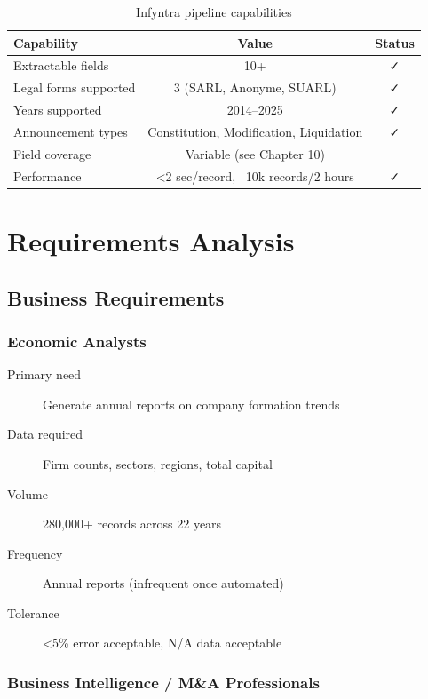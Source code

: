 \documentclass[12pt,a4paper]{report}
\begin{document}
\begin{table}[H]
\centering
\begin{tabular}{|l|c|c|}
\hline
\textbf{Capability} & \textbf{Value} & \textbf{Status} \\
\hline
Extractable fields & 10+ & ✓ \\
Legal forms supported & 3 (SARL, Anonyme, SUARL) & ✓ \\
Years supported & 2014--2025 & ✓ \\
Announcement types & Constitution, Modification, Liquidation & ✓ \\
Field coverage & Variable (see Chapter 10) & 🔄 \\
Performance & <2 sec/record, ~10k records/2 hours & ✓ \\
\hline
\end{tabular}
\caption{Infyntra pipeline capabilities}
\end{table}

\chapter{Requirements Analysis}

\section{Business Requirements}

\subsection{Economic Analysts}

\begin{description}
    \item[Primary need] Generate annual reports on company formation trends
    \item[Data required] Firm counts, sectors, regions, total capital
    \item[Volume] 280,000+ records across 22 years
    \item[Frequency] Annual reports (infrequent once automated)
    \item[Tolerance] <5\% error acceptable, N/A data acceptable
\end{description}

\subsection{Business Intelligence / M\&A Professionals}
\end{document}
